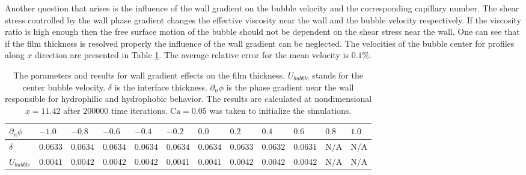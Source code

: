 \documentclass[preprint,12pt]{elsarticle}
\newcommand{\Ca}{\mathrm{Ca}}
\begin{document}
Another question that arises is the influence of the wall gradient on the bubble velocity and the
corresponding capillary number. The shear stress controlled by the wall phase gradient changes the
effective viscosity near the wall and the bubble velocity respectively. If the viscosity ratio is
high enough then the free surface motion of the bubble should not be dependent on the shear stress
near the wall.
One can see that if the film thickness is resolved properly the influence of the wall gradient can
be neglected. The velocities of the bubble center for profiles along $x$ direction are
presented in Table
\ref{table:parameters:wall:gradient}. 
The average relative error for the mean velocity is $0.1\%$.
\begin{table}
\begin{tabularx}{\textwidth}{|X|X X X X X X X X X X X|}
\hline
$\scriptstyle \partial_n \phi$& $\scriptstyle -1.0$& $\scriptstyle -0.8$&
$\scriptstyle -0.6$&$\scriptstyle -0.4$&$\scriptstyle -0.2$&$\scriptstyle
0.0$&$\scriptstyle 0.2$&$\scriptstyle 0.4$&$\scriptstyle 0.6$&$\scriptstyle 0.8$&$\scriptstyle
1.0$\\
\hline
$\scriptstyle \delta$& $\scriptstyle 0.0633$& $\scriptstyle 0.0634$& $\scriptstyle 0.0634$&
$\scriptstyle 0.0634$& $\scriptstyle 0.0634$& $\scriptstyle 0.0634$& $\scriptstyle 0.0633$&
$\scriptstyle 0.0632$& $\scriptstyle 0.0631$ &$\scriptstyle \mathrm{N/A}$&$\scriptstyle
\mathrm{N/A}$\\
\hline
$\scriptstyle U_{bubble}$ &$\scriptstyle 0.0041$& $\scriptstyle 0.0042$& $\scriptstyle 0.0042$
&$\scriptstyle 0.0042$ & $\scriptstyle 0.0041$& $\scriptstyle 0.0041$ & $\scriptstyle 0.0042$ &
$\scriptstyle 0.0042$ & $\scriptstyle 0.0042$ & $\scriptstyle \mathrm{N/A}$ &$\scriptstyle
\mathrm{N/A}$\\
\hline
\end{tabularx}
\caption{The parameters and results for wall gradient effects on the film thickness. $U_{bubble}$
stands for the
center bubble velocity. $\delta$ is the interface thickness. $\partial_n \phi$ is the phase
gradient near the wall responsible for hydrophilic and hydrophobic behavior. The results are
calculated at nondimensional $x=11.42$ after $200 000$ time iterations. $\Ca=0.05$ was taken to
initialize the simulations.
\label{table:parameters:wall:gradient}}
\end{table}
\end{document}
